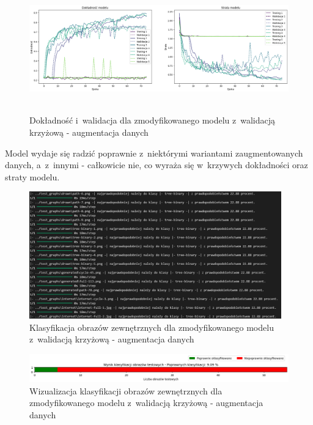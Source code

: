 \begin{figure}[ht]
	\centering
	\includegraphics[height=5.5cm]{resources/tests/images/v4/crossvalid_3_img.png}
	\caption{Dokładność i~walidacja dla zmodyfikowanego modelu z~walidacją krzyżową - augmentacja danych}
	\label{Fig:tests-cv-3a}
\end{figure}
\FloatBarrier

Model wydaje się radzić poprawnie z~niektórymi wariantami zaugmentowanych danych, a~z~innymi - całkowicie nie,
co wyraża się w~krzywych dokładności oraz straty modelu.

\begin{figure}[ht]
	\centering
	\includegraphics[height=5.5cm]{resources/tests/images/v4/crossvalid_3_txt.png}
	\caption{Klasyfikacja obrazów zewnętrznych dla zmodyfikowanego modelu z~walidacją krzyżową - augmentacja danych}
	\label{Fig:tests-cv-3b}
\end{figure}
\FloatBarrier

\begin{figure}[ht]
	\centering
	\includegraphics[width=14cm]{resources/tests/images/v4/crossvalid_3_bar.png}
	\caption{Wizualizacja klasyfikacji obrazów zewnętrznych dla zmodyfikowanego modelu z~walidacją krzyżową - augmentacja danych}
	\label{Fig:tests-cv-3c}
\end{figure}
\FloatBarrier

